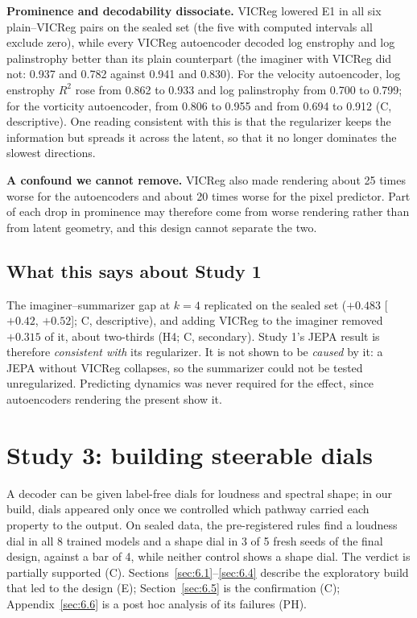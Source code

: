 \documentclass[10pt]{article}
\begin{document}
\textbf{Prominence and decodability dissociate.} VICReg lowered E1 in all six plain--VICReg pairs on the sealed set (the five with computed intervals all exclude zero), while every VICReg autoencoder decoded log enstrophy and log palinstrophy better than its plain counterpart (the imaginer with VICReg did not: 0.937 and 0.782 against 0.941 and 0.830). For the velocity autoencoder, log enstrophy $R^2$ rose from 0.862 to 0.933 and log palinstrophy from 0.700 to 0.799; for the vorticity autoencoder, from 0.806 to 0.955 and from 0.694 to 0.912 (C, descriptive). One reading consistent with this is that the regularizer keeps the information but spreads it across the latent, so that it no longer dominates the slowest directions.

\textbf{A confound we cannot remove.} VICReg also made rendering about 25 times worse for the autoencoders and about 20 times worse for the pixel predictor. Part of each drop in prominence may therefore come from worse rendering rather than from latent geometry, and this design cannot separate the two.

\subsection{What this says about Study 1}\label{sec:5.4}

The imaginer--summarizer gap at $k = 4$ replicated on the sealed set ($+0.483$ [$+0.42$, $+0.52$]; C, descriptive), and adding VICReg to the imaginer removed $+0.315$ of it, about two-thirds (H4; C, secondary). Study 1's JEPA result is therefore \emph{consistent with} its regularizer. It is not shown to be \emph{caused} by it: a JEPA without VICReg collapses, so the summarizer could not be tested unregularized. Predicting dynamics was never required for the effect, since autoencoders rendering the present show it.

\section{Study 3: building steerable dials}\label{sec:6}

A decoder can be given label-free dials for loudness and spectral shape; in our build, dials appeared only once we controlled which pathway carried each property to the output. On sealed data, the pre-registered rules find a loudness dial in all 8 trained models and a shape dial in 3 of 5 fresh seeds of the final design, against a bar of 4, while neither control shows a shape dial. The verdict is partially supported (C). Sections~\ref{sec:6.1}--\ref{sec:6.4} describe the exploratory build that led to the design (E); Section~\ref{sec:6.5} is the confirmation (C); Appendix~\ref{sec:6.6} is a post hoc analysis of its failures (PH).
\end{document}
